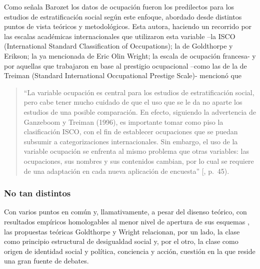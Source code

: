 \documentclass[
]{book}
\begin{document}
Como señala Barozet \citeyearpar{Barozet2007} los datos de ocupación fueron los predilectos para los estudios de estratificación social según este enfoque, abordado desde distintos puntos de vista teóricos y metodológicos. Esta autora, haciendo un recorrido por las escalas académicas internacionales que utilizaron esta variable --la ISCO (International Standard Classification of Occupations); la de Goldthorpe y Erikson; la ya mencionada de Eric Olin Wright; la escala de ocupación francesa- y por aquellas que trabajaron en base al prestigio ocupacional --como las de la de Treiman (Standard International Occupational Prestige Scale)- mencionó que

\begin{quote}
``La variable ocupación es central para los estudios de estratificación social, pero cabe tener mucho cuidado de que el uso que se le da no aparte los estudios de una posible comparación. En efecto, siguiendo la advertencia de Ganzeboom y Treiman (1996), es importante tomar como piso la clasificación ISCO, con el fin de establecer ocupaciones que se puedan subsumir a categorizaciones internacionales. Sin embargo, el uso de la variable ocupación se enfrenta al mismo problema que otras variables: las ocupaciones, sus nombres y sus contenidos cambian, por lo cual se requiere de una adaptación en cada nueva aplicación de encuesta'' {[}\citet{Barozet2007}, p.~45).
\end{quote}

\hypertarget{no-tan-distintos}{%
\subsubsection{No tan distintos}\label{no-tan-distintos}}

Con varios puntos en común y, llamativamente, a pesar del disenso teórico, con resultados empíricos homologables al menor nivel de apertura de sus esquemas \citep{Crompton2008}, las propuestas teóricas Goldthorpe y Wright relacionan, por un lado, la clase como principio estructural de desigualdad social y, por el otro, la clase como origen de identidad social y política, conciencia y acción, cuestión en la que reside una gran fuente de debates.
\end{document}
